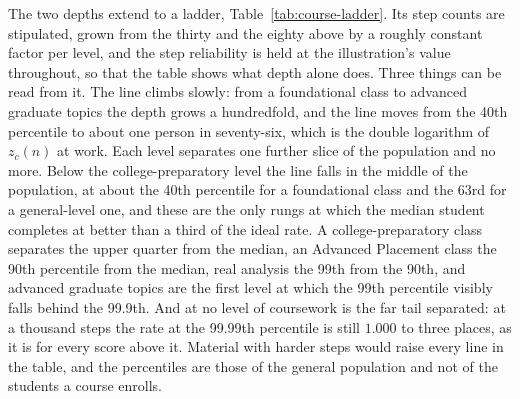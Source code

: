 \documentclass{article}
\begin{document}
The two depths extend to a ladder, Table~\ref{tab:course-ladder}. Its step counts are stipulated, grown from the thirty and the eighty above by a roughly constant factor per level, and the step reliability is held at the illustration's value throughout, so that the table shows what depth alone does. Three things can be read from it. The line climbs slowly: from a foundational class to advanced graduate topics the depth grows a hundredfold, and the line moves from the 40th percentile to about one person in seventy-six, which is the double logarithm of $z_c(n)$ at work. Each level separates one further slice of the population and no more. Below the college-preparatory level the line falls in the middle of the population, at about the 40th percentile for a foundational class and the 63rd for a general-level one, and these are the only rungs at which the median student completes at better than a third of the ideal rate. A college-preparatory class separates the upper quarter from the median, an Advanced Placement class the 90th percentile from the median, real analysis the 99th from the 90th, and advanced graduate topics are the first level at which the 99th percentile visibly falls behind the 99.9th. And at no level of coursework is the far tail separated: at a thousand steps the rate at the 99.99th percentile is still $1.000$ to three places, as it is for every score above it. Material with harder steps would raise every line in the table, and the percentiles are those of the general population and not of the students a course enrolls.
\end{document}

